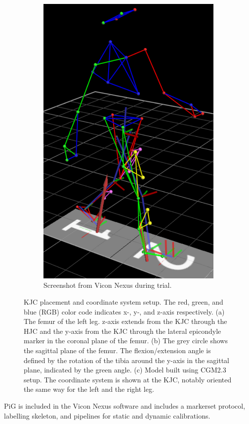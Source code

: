 \documentclass[../main.tex]{subfiles}
\begin{document}
\begin{figure}[!htb]
\begin{subfigure}[t]{0.3\textwidth}
        \includegraphics[width=\textwidth]{img/experiment_capture2.pdf}
        \caption{Screenshot from Vicon Nexus during trial.}
        \label{fig:A-cgm23-markerset-experiment-capture}
    \end{subfigure}
    \caption{\Ac{KJC} placement and coordinate system setup. The red, green, and blue (RGB) color code indicates x-, y-, and z-axis respectively. (a) The femur of the left leg. z-axis extends from the \ac{KJC} through the \ac{HJC} and the y-axis from the \ac{KJC} through the lateral epicondyle marker in the coronal plane of the femur. (b) The grey circle shows the sagittal plane of the femur. The flexion/extension angle is defined by the rotation of the tibia around the y-axis in the sagittal plane, indicated by the green angle. (c) Model built using CGM2.3 setup. The coordinate system is shown at the \ac{KJC}, notably oriented the same way for the left and the right leg.}
    \label{fig:knee-joint-coordinates}
\end{figure}
\Ac{PiG} is included in the Vicon Nexus software and includes a markerset protocol, labelling skeleton, and pipelines for static and dynamic calibrations. 
\end{document}
